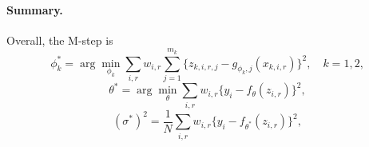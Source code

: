 \documentclass{article}
\begin{document}

\paragraph{Summary.}
Overall, the M-step is
\begin{equation}
\phi_k^* = \arg\min_{\phi_k} \sum_{i,r} w_{i,r} \sum_{j=1}^{m_k} \{z_{k,i,r,j} - g_{\phi_k,j}(x_{k,i,r})\}^2,\quad k=1,2,
 \end{equation}
\begin{equation}
\theta^* = \arg\min_\theta \sum_{i,r} w_{i,r}\{y_i - f_{\theta}(z_{i,r})\}^2,
\end{equation}
\begin{equation}
\label{eq_sigma}
(\sigma^{*})^2 = \frac{1}{N} \sum_{i,r} w_{i,r}\{y_i - f_{\theta^*}(z_{i,r})\}^2,
\end{equation}
\begin{equation}
\end{equation}
\end{document}
